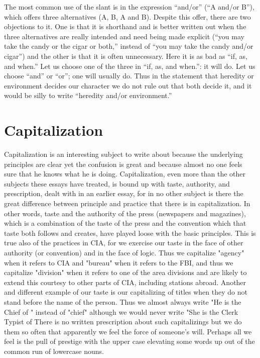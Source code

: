 \documentclass[
    oneside,
    11pt,
    draft
]{memoir}
\begin{document}
The most common use of the slant is in the expression \enquote{and/or} (\enquote{A and/or B}), which offers three alternatives (A, B, A and B). Despite this offer, there are two objections to it. One is that it is shorthand and is better written out when the three alternatives are really intended and need being made explicit (\enquote{you may take the candy or the cigar or both,} instead of \enquote{you may take the candy and/or cigar}) and the other is that it is often unnecessary. Here it is as bad as \enquote{if, as, and when.} Let us choose one of the three in \enquote{if, as, and when.}: it will do. Let us choose \enquote{and} or \enquote{or}; one will usually do. Thus in the statement that heredity or environment decides our character we do not rule out that both decide it, and it would be silly to write \enquote{heredity and/or environment.}

\chapter{Capitalization}

Capitalization is an interesting subject to write about because the underlying principles are clear yet the confusion is great and because almost no one feels sure that he knows what he is doing. Capitalization, even more than the other subjects these essays have treated, is bound up with taste, authority, and prescription, dealt with in an earlier essay, for in no other subject is there the great difference between principle and practice that there is in capitalization. In other words, taste and the authority of the press (newspapers and magazines), which is a combination of the taste of the press and the convention which that taste both follows and creates, have played loose with the basic principles. This is true also of the practices in CIA, for we exercise our taste in the face of other authority (or convention) and in the face of logic. Thus we capitalize "agency" when it refers to CIA and "bureau" when it refers to the FBI, and thus we capitalize "division" when it refers to one of the area divisions and are likely to extend this courtesy to other parts of CIA, including stations abroad. Another and different example of our taste is our capitalizing of titles when they do not stand before the name of the person. Thus we almost always write "He is the Chief of " instead of "chief" although we would never write "She is the Clerk Typist of  There is no written prescription about such capitalizings but we do them so often that apparently we feel the force of someone's will. Perhaps all we feel is the pull of prestige with the upper case elevating some words up out of the common run of lowercase nouns.
\end{document}
